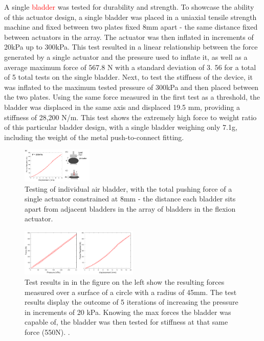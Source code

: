 \documentclass[letterpaper, 10 pt, conference]{ieeeconf}  %
\begin{document}
A single \textcolor{red}{bladder} was tested for durability and strength.  To showcase the ability of this actuator design, a single bladder was placed in a uniaxial tensile strength machine and fixed between two plates fixed 8mm apart - the same distance fixed between actuators in the array.  The actuator was then inflated in increments of 20kPa up to 300kPa.  This test resulted in a linear relationship between the force generated by a single actuator and the pressure used to inflate it, as well as a average maximum force of 567.8 N with a standard deviation of 3. 56 for a total of 5 total tests on the single bladder.  Next, to test the stiffness of the device, it was inflated to the maximum tested pressure of 300kPa and then placed between the two plates.  Using the same force measured in the first test as a threshold, the bladder was displaced in the same axis and displaced 19.5 mm, providing a stiffness of 28,200 N/m. This test shows the extremely high force to weight ratio of this particular bladder design, with a single bladder weighing only 7.1g, including the weight of the metal push-to-connect fitting. 

\begin{figure}[t!]
\centering
\includegraphics[width=0.3\textwidth]{stiiffnesstest.PNG}
\caption{Testing of individual air bladder, with the total pushing force of a single actuator constrained at 8mm - the distance each bladder sits apart from adjacent bladders in the array of bladders in the flexion actuator.}
\label{fig:stifftest}
\end{figure}

\begin{figure}
\centering
\includegraphics[width=0.5\textwidth]{singlebladder.PNG}
\caption{Test results in in the figure on the left show the resulting forces measured over a surface of a circle with a radius of 45mm.  The test results display the outcome of 5 iterations of  increasing the pressure in increments of 20 kPa.   Knowing the max forces the bladder was capable of, the bladder was then tested for stiffness at that same force (550N).
.}
\label{fig:stifftest}
\end{figure}
\end{document}
